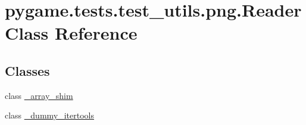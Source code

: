 \hypertarget{classpygame_1_1tests_1_1test__utils_1_1png_1_1_reader}{}\section{pygame.\+tests.\+test\+\_\+utils.\+png.\+Reader Class Reference}
\label{classpygame_1_1tests_1_1test__utils_1_1png_1_1_reader}
\subsection*{Classes}
\begin{DoxyCompactItemize}
\item 
class \hyperlink{classpygame_1_1tests_1_1test__utils_1_1png_1_1_reader_1_1__array__shim}{\+\_\+array\+\_\+shim}
\item 
class \hyperlink{classpygame_1_1tests_1_1test__utils_1_1png_1_1_reader_1_1__dummy__itertools}{\+\_\+dummy\+\_\+itertools}
\end{DoxyCompactItemize}
